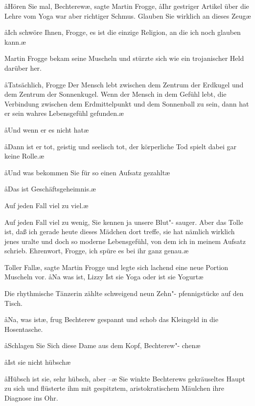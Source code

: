 \aa{}Hören Sie mal, Bechterew\ae{}, sagte Martin Frogge, \aa{}Ihr
gestriger Artikel über die Lehre vom Yoga war aber richtiger
Schmus. Glauben Sie wirklich an dieses Zeug\frag{}\ae{}

\aa{}Ich schwöre Ihnen, Frogge, es ist die einzige Religion, an
die ich noch glauben kann.\ae{}

Martin Frogge bekam seine Muscheln und stürzte sich wie ein
trojanischer Held darüber her.

\aa{}Tatsächlich, Frogge\ausr{} Der Mensch lebt zwischen dem Zentrum
der Erdkugel und dem Zentrum der Sonnenkugel. Wenn der
Mensch in dem Gefühl lebt, die Verbindung zwischen dem
Erdmittelpunkt und dem Sonnenball zu sein, dann hat er
sein wahres Lebensgefühl gefunden.\ae{}

\aa{}Und wenn er es nicht hat\frag{}\ae{}

\aa{}Dann ist er tot, geistig und seelisch tot, der körperliche Tod
spielt dabei gar keine Rolle.\ae{}

\aa{}Und was bekommen Sie für so einen Aufsatz gezahlt\frag{}\ae{}

\aa{}Das ist Geschäftsgeheimnis.\ae{}

\aanah{}Auf jeden Fall viel zu viel.\ae{}

\aanah{}Auf jeden Fall viel zu wenig, Sie kennen ja unsere Blut"-%
sauger. Aber das Tolle ist, daß ich gerade heute dieses
Mädchen dort treffe, sie hat nämlich wirklich jenes uralte und
doch so moderne Lebensgefühl, von dem ich in meinem
Aufsatz schrieb. Ehrenwort, Frogge, ich spüre es bei ihr ganz
genau.\ae{}

\aanah{}Toller Fall\ae{}, sagte Martin Frogge und legte sich lachend eine
neue Portion Muscheln vor. \aa{}Na was ist, Lizzy\frag{} Ist sie Yoga
oder ist sie Yogurt\frag{}\ae{}

Die rhythmische Tänzerin zählte schweigend neun Zehn"-%
pfennigstücke auf den Tisch.

\aa{}Na, was ist\frag{}\ae{},\eingriff{eS52-1}{ist\frag{}\ae{}, ] ist\frag{}\ae{}} frug Bechterew gespannt und schob das
Kleingeld in die Hosentasche.

\aa{}Schlagen Sie Sich%
\eingriff{eS52-2}{Sich ] sich}
diese Dame aus dem Kopf, Bechterew"-%
chen\ausr{}\ae{}

\aa{}Ist sie nicht hübsch\frag{}\ae{}

\aa{}Hübsch ist sie, sehr hübsch, aber --\ae{} Sie winkte Bechterews
gekräuseltes Haupt zu sich und flüsterte ihm mit gespitztem,
aristokratischem Mäulchen ihre Diagnose ins Ohr.

